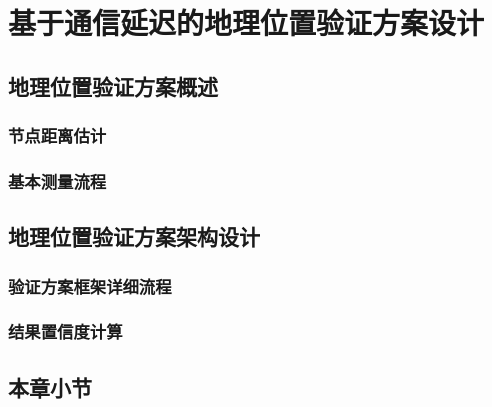 \chapter{基于通信延迟的地理位置验证方案设计}

\section{地理位置验证方案概述}

\subsection{节点距离估计}

\subsection{基本测量流程}

\section{地理位置验证方案架构设计}

\subsection{验证方案框架详细流程}



\subsection{结果置信度计算}

\section{本章小节}

\endinput